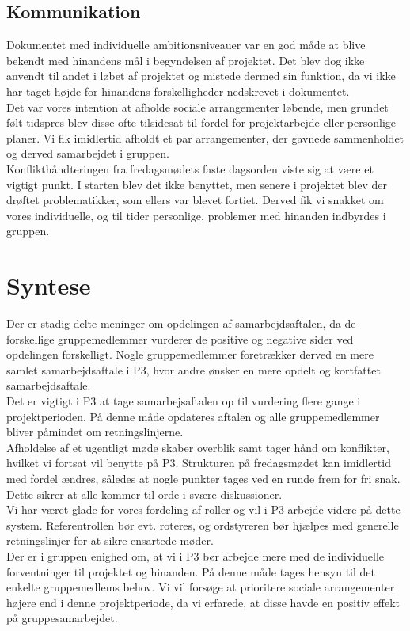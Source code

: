\subsection{Kommunikation}
Dokumentet med individuelle ambitionsniveauer var en god måde at blive bekendt med hinandens mål i begyndelsen af projektet. Det blev dog ikke anvendt til andet i løbet af projektet og mistede dermed sin funktion, da vi ikke har taget højde for hinandens forskelligheder nedskrevet i dokumentet. \\
Det var vores intention at afholde sociale arrangementer løbende, men grundet følt tidspres blev disse ofte tilsidesat til fordel for projektarbejde eller personlige planer. Vi fik imidlertid afholdt et par arrangementer, der gavnede sammenholdet og derved samarbejdet i gruppen. \\
Konflikthåndteringen fra fredagsmødets faste dagsorden viste sig at være et vigtigt punkt. I starten blev det ikke benyttet, men senere i projektet blev der drøftet problematikker, som ellers var blevet fortiet. Derved fik vi snakket om vores individuelle, og til tider personlige, problemer med hinanden indbyrdes i gruppen.

\section{Syntese}
Der er stadig delte meninger om opdelingen af samarbejdsaftalen, da de forskellige gruppemedlemmer vurderer de positive og negative sider ved opdelingen forskelligt. Nogle gruppemedlemmer foretrækker derved en mere samlet samarbejdsaftale i P$3$, hvor andre ønsker en mere opdelt og kortfattet samarbejdsaftale. \\
Det er vigtigt i P$3$ at tage samarbejsaftalen op til vurdering flere gange i projektperioden. På denne måde opdateres aftalen og alle gruppemedlemmer bliver påmindet om retningslinjerne. \\
Afholdelse af et ugentligt møde skaber overblik samt tager hånd om konflikter, hvilket vi fortsat vil benytte på P$3$. Strukturen på fredagsmødet kan imidlertid med fordel ændres, således at nogle punkter tages ved en runde frem for fri snak. Dette sikrer at alle kommer til orde i svære diskussioner. \\
Vi har været glade for vores fordeling af roller og vil i P$3$ arbejde videre på dette system. Referentrollen bør evt. roteres, og ordstyreren bør hjælpes med generelle retningslinjer for at sikre ensartede møder. \\
Der er i gruppen enighed om, at vi i P$3$ bør arbejde mere med de individuelle forventninger til projektet og hinanden. På denne måde tages hensyn til det enkelte gruppemedlems behov. Vi vil forsøge at prioritere sociale arrangementer højere end i denne projektperiode, da vi erfarede, at disse havde en positiv effekt på gruppesamarbejdet.  
